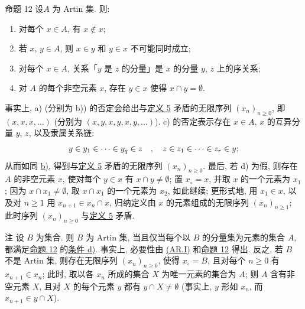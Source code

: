 \hypertarget{sga4.exp.I.appendix.II.sec.6.proposition.12}{}
\begin{enonce*}{命题 12}
设\pageoriginale $A$ 为 Artin 集. 则:
\begin{enumerate}
\renewcommand{\theenumi}{\alph{enumi}}
\renewcommand{\labelenumi}{\theenumi)}
\hypertarget{sga4.exp.I.appendix.II.sec.6.proposition.12.part.a}{}
\item 对每个 $x\in A$, 有 $x\not\in x$;

\hypertarget{sga4.exp.I.appendix.II.sec.6.proposition.12.part.b}{}
\item 若 $x$, $y\in A$, 则 $x\in y$ 和 $y\in x$ 不可能同时成立;

\hypertarget{sga4.exp.I.appendix.II.sec.6.proposition.12.part.c}{}
\item 对每个 $x\in A$, 关系「$y$ 是 $z$ 的分量」是 $x$ 的分量 $y$, $z$ 上的序关系;

\hypertarget{sga4.exp.I.appendix.II.sec.6.proposition.12.part.d}{}
\item 对 $A$ 的每个非空元素 $x$, 存在 $y\in x$ 使得 $x\cap y=∅$.
\end{enumerate}
\end{enonce*}
事实上, a) (分别为 b)) 的否定会给出与\hyperlink{sga4.exp.I.appendix.II.sec.6.definition.5}{定义 5} 矛盾的无限序列 $(x_n)_{n\geq 0}$, 即 $(x,x,x,\ldots)$ (分别为 $(x,y,x,y,x,y,\ldots)$). c) 的否定表示存在 $x\in A$, $x$ 的互异分量 $y$, $z$, 以及隶属关系链:
$$
y\in y_1\in\dots \in y_q\in z\quad,\quad z\in z_1\in\dots\in z_r\in
y{};
$$
从而如同 \hyperlink{sga4.exp.I.appendix.II.sec.6.proposition.12.part.b}{b)}, 得到与\hyperlink{sga4.exp.I.appendix.II.sec.6.definition.5}{定义 5} 矛盾的无限序列 $(x_n)_{n\geq 0}$. 最后, 若 d) 为假, 则存在 $A$ 的非空元素 $x$, 使对每个 $y\in x$ 有 $x\cap y\neq ∅$; 置 $x_\circ=x$, 并取 $x$ 的一个元素为 $x_1$; 因为 $x\cap x_1\neq ∅$, 取 $x\cap x_1$ 的一个元素为 $x_2$, 如此继续; 更形式地, 用 $x_1\in x$, 以及对 $n\geq 1$ 用 $x_{n+1}\in x_n\cap x$, 归纳定义由 $x$ 的元素组成的无限序列 $(x_n)_{n\geq 1}$; 此时序列 $(x_n)_{n\geq 0}$ 与\hyperlink{sga4.exp.I.appendix.II.sec.6.definition.5}{定义 5} 矛盾.

\begin{enonce*}[remark]{注}
设 $B$ 为集合. 则 $B$ 为 Artin 集, 当且仅当每个以 $B$ 的分量集为元素的集合 $A$, 都满足\hyperlink{sga4.exp.I.appendix.II.sec.6.proposition.12}{命题 12} 的\hyperlink{sga4.exp.I.appendix.II.sec.6.proposition.12.part.d}{条件 d)}. 事实上, 必要性由 \hyperlink{sga4.exp.I.appendix.II.sec.6.property.AR.I}{(AR.I)} 和\pageoriginale \hyperlink{sga4.exp.I.appendix.II.sec.6.proposition.12}{命题 12} 得出. 反之, 若 $B$ 不是 Artin 集, 则存在无限序列 $(x_n)_{n\geq0}$, 使得 $x_{\circ}=B$, 且对每个 $n\geq 0$ 有 $x_{n+1}\in x_n$; 此时, 取以各 $x_n$ 所成的集合 $X$ 为唯一元素的集合为 $A$; 则 $A$ 含有非空元素 $X$, 且对 $X$ 的每个元素 $y$ 都有 $y\cap X\neq ∅$ (事实上, $y$ 形如 $x_n$, 而 $x_{n+1}\in y\cap X$).
\end{enonce*}


